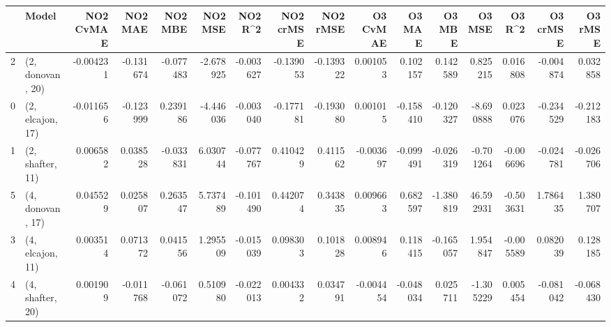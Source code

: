 \begin{tabular}{llrrrrrrrrrrrrrr}
\toprule
{} &             Model &  NO2 CvMAE &   NO2 MAE &   NO2 MBE &   NO2 MSE &   NO2 R\textasciicircum2 &  NO2 crMSE &  NO2 rMSE &  O3 CvMAE &    O3 MAE &    O3 MBE &     O3 MSE &    O3 R\textasciicircum2 &  O3 crMSE &   O3 rMSE \\
\midrule
2 &  (2, donovan, 20) &  -0.004231 & -0.131674 & -0.077483 & -2.678925 & -0.003627 &  -0.139053 & -0.139322 &  0.001053 &  0.102157 &  0.142589 &   0.825215 &  0.016808 & -0.004874 &  0.032858 \\
0 &  (2, elcajon, 17) &  -0.011656 & -0.123999 &  0.239186 & -4.446036 & -0.003040 &  -0.177181 & -0.193080 &  0.001015 & -0.158410 & -0.120327 &  -8.690888 &  0.023076 & -0.234529 & -0.212183 \\
1 &  (2, shafter, 11) &   0.006582 &  0.038528 & -0.033831 &  6.030744 & -0.077767 &   0.410429 &  0.411562 & -0.003697 & -0.099491 & -0.026319 &  -0.701264 & -0.006696 & -0.024781 & -0.026706 \\
5 &  (4, donovan, 17) &   0.045529 &  0.025807 &  0.263547 &  5.737489 & -0.101490 &   0.442074 &  0.343835 &  0.009663 &  0.682597 & -1.380819 &  46.592931 & -0.503631 &  1.786435 &  1.380707 \\
3 &  (4, elcajon, 11) &   0.003514 &  0.071372 &  0.041556 &  1.295509 & -0.015039 &   0.098303 &  0.101828 &  0.008946 &  0.118415 & -0.165057 &   1.954847 & -0.005589 &  0.082039 &  0.128185 \\
4 &  (4, shafter, 20) &   0.001909 & -0.011768 & -0.061072 &  0.510980 & -0.022013 &   0.004332 &  0.034791 & -0.004454 & -0.048034 &  0.025711 &  -1.305229 &  0.005454 & -0.081042 & -0.068430 \\
\bottomrule
\end{tabular}
